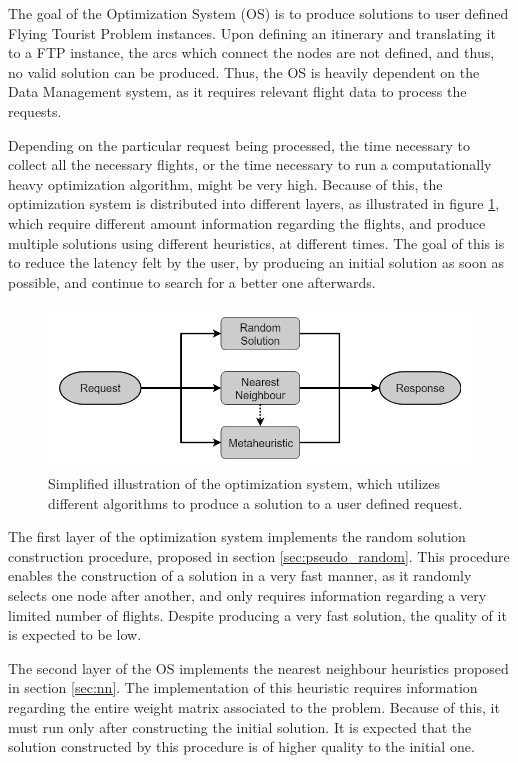 The goal of the Optimization System (OS) is to produce solutions to user defined Flying Tourist Problem instances. Upon defining an itinerary and translating it to a FTP instance, the arcs which connect the nodes are not defined, and thus, no valid solution can be produced. Thus, the OS is heavily dependent on the Data Management system, as it requires relevant flight data to process the requests. 

Depending on the particular request being processed, the time necessary to collect all the necessary flights, or the time necessary to run a computationally heavy optimization algorithm, might be very high. Because of this, the optimization system is distributed into different layers, as illustrated in figure \ref{fig:optimization_system}, which require different amount information regarding the flights, and produce multiple solutions using different heuristics, at different times. The goal of this is to reduce the latency felt by the user, by producing an initial solution as soon as possible, and continue to search for a better one afterwards.

\begin{figure}[htpb]
  \centering
  \includegraphics[width=\textwidth]{./Figures/system_design/utility.png}
  \caption{Simplified illustration of the optimization system, which utilizes different algorithms 
  to produce a solution to a user defined request.}
  \label{fig:optimization_system}  
\end{figure}

The first layer of the optimization system implements the random solution construction procedure, proposed in section \ref{sec:pseudo_random}. This procedure enables the construction of a solution in a very fast manner, as it randomly selects one node after another, and only requires information regarding a very limited number of flights. Despite producing a very fast solution, the quality of it is expected to be low.

The second layer of the OS implements the nearest neighbour heuristics proposed in section \ref{sec:nn}. The implementation of this heuristic requires information regarding the entire weight matrix associated to the problem. Because of this, it must run only after constructing the initial solution. It is expected that the solution constructed by this procedure is of higher quality to the initial one.

